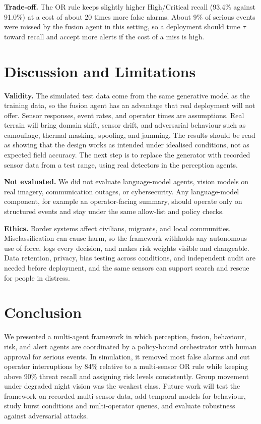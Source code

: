 \documentclass[conference]{IEEEtran}
\begin{document}
\textbf{Trade-off.} The OR rule keeps slightly higher High/Critical recall (93.4\% against 91.0\%) at a cost of about 20 times more false alarms. About 9\% of serious events were missed by the fusion agent in this setting, so a deployment should tune $\tau$ toward recall and accept more alerts if the cost of a miss is high.

\section{Discussion and Limitations}
\textbf{Validity.} The simulated test data come from the same generative model as the training data, so the fusion agent has an advantage that real deployment will not offer. Sensor responses, event rates, and operator times are assumptions. Real terrain will bring domain shift, sensor drift, and adversarial behaviour such as camouflage, thermal masking, spoofing, and jamming. The results should be read as showing that the design works as intended under idealised conditions, not as expected field accuracy. The next step is to replace the generator with recorded sensor data from a test range, using real detectors in the perception agents.

\textbf{Not evaluated.} We did not evaluate language-model agents, vision models on real imagery, communication outages, or cybersecurity. Any language-model component, for example an operator-facing summary, should operate only on structured events and stay under the same allow-list and policy checks.

\textbf{Ethics.} Border systems affect civilians, migrants, and local communities. Misclassification can cause harm, so the framework withholds any autonomous use of force, logs every decision, and makes risk weights visible and changeable. Data retention, privacy, bias testing across conditions, and independent audit are needed before deployment, and the same sensors can support search and rescue for people in distress.

\section{Conclusion}
We presented a multi-agent framework in which perception, fusion, behaviour, risk, and alert agents are coordinated by a policy-bound orchestrator with human approval for serious events. In simulation, it removed most false alarms and cut operator interruptions by 84\% relative to a multi-sensor OR rule while keeping above 90\% threat recall and assigning risk levels consistently. Group movement under degraded night vision was the weakest class. Future work will test the framework on recorded multi-sensor data, add temporal models for behaviour, study burst conditions and multi-operator queues, and evaluate robustness against adversarial attacks.
\end{document}
